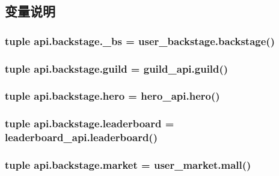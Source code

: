 \subsection{变量说明}
\hypertarget{namespaceapi_1_1backstage_a0851633c94cfbf85f12206e68b4f766a}{
\subsubsection[{\-\_\-bs}]{\setlength{\rightskip}{0pt plus 5cm}tuple api.\-backstage.\-\_\-bs = user\-\_\-backstage.\-backstage()}}\label{namespaceapi_1_1backstage_a0851633c94cfbf85f12206e68b4f766a}
\hypertarget{namespaceapi_1_1backstage_a0c7974dde6ecfec0df511eb7eeeb0780}{
\subsubsection[{guild}]{\setlength{\rightskip}{0pt plus 5cm}tuple api.\-backstage.\-guild = guild\-\_\-api.\-guild()}}\label{namespaceapi_1_1backstage_a0c7974dde6ecfec0df511eb7eeeb0780}
\hypertarget{namespaceapi_1_1backstage_a66ee1a73f79a363be7bdcdd33ef61dc1}{
\subsubsection[{hero}]{\setlength{\rightskip}{0pt plus 5cm}tuple api.\-backstage.\-hero = hero\-\_\-api.\-hero()}}\label{namespaceapi_1_1backstage_a66ee1a73f79a363be7bdcdd33ef61dc1}
\hypertarget{namespaceapi_1_1backstage_a4095072443a2bf9b5457108550293f82}{
\subsubsection[{leaderboard}]{\setlength{\rightskip}{0pt plus 5cm}tuple api.\-backstage.\-leaderboard = leaderboard\-\_\-api.\-leaderboard()}}\label{namespaceapi_1_1backstage_a4095072443a2bf9b5457108550293f82}
\hypertarget{namespaceapi_1_1backstage_a8af69099b54eef7324ca8d9995b1fcf9}{
\subsubsection[{market}]{\setlength{\rightskip}{0pt plus 5cm}tuple api.\-backstage.\-market = user\-\_\-market.\-mall()}}\label{namespaceapi_1_1backstage_a8af69099b54eef7324ca8d9995b1fcf9}
